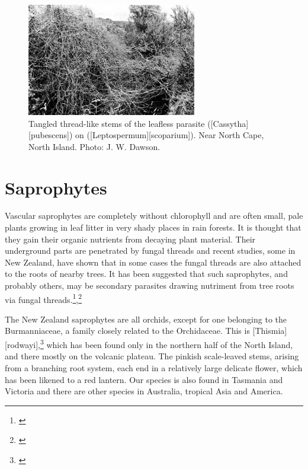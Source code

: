 \begin{figure}
	\includegraphics[width=0.66\textwidth]{graphics/fig_059}
	\centering
	\caption[Tangled thread-like stems of the leafless parasite taihoa (\emph{Cassytha pubescens})]{Tangled thread-like stems of the leafless parasite  ([Cassytha][pubescens]) on  ([Leptospermum][scoparium]).
	Near North Cape, North Island.
	Photo: J. W. Dawson.}%
	\label{fig:59cassytha}
\end{figure}

\section{Saprophytes}

Vascular saprophytes are completely without chlorophyll and are often small, pale plants growing in leaf litter in very shady places in rain forests.
It is thought that they gain their organic nutrients from decaying plant material.
Their underground parts are penetrated by fungal threads and recent studies, some in New Zealand, have shown that in some cases the fungal threads are also attached to the roots of nearby trees.
It has been suggested that such saprophytes, and probably others, may be secondary parasites drawing nutriment from tree roots via fungal threads.\footnote{\cite{campbell1962mycorrhiza}},\footnote{\cite{campbell1968investigation}}

The New Zealand saprophytes are all orchids, except for one belonging to the Burmanniaceae, a family closely related to the Orchidaceae.
This is [Thismia][rodwayi],\footnote{\cite{campbell1968investigation}} which has been found only in the northern half of the North Island, and there mostly on the volcanic plateau.
The pinkish scale-leaved stems, arising from a branching root system, each end in a relatively large delicate flower, which has been likened to a red lantern.
Our species is also found in Tasmania and Victoria and there are other species in Australia, tropical Asia and America.

